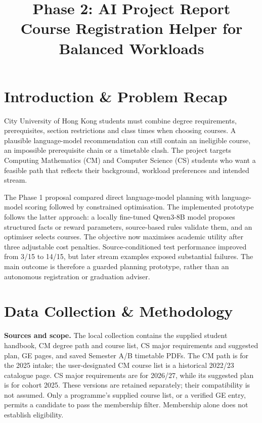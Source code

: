 \documentclass{article}
\title{Phase 2: AI Project Report\\
\large Course Registration Helper for Balanced Workloads}
\author{}
\begin{document}
\maketitle

\section{Introduction \& Problem Recap}
City University of Hong Kong students must combine degree requirements, prerequisites, section restrictions and class times when choosing courses. A plausible language-model recommendation can still contain an ineligible course, an impossible prerequisite chain or a timetable clash. The project targets Computing Mathematics (CM) and Computer Science (CS) students who want a feasible path that reflects their background, workload preferences and intended stream.

The Phase 1 proposal compared direct language-model planning with language-model scoring followed by constrained optimisation. The implemented prototype follows the latter approach: a locally fine-tuned Qwen3-8B model proposes structured facts or reward parameters, source-based rules validate them, and an optimiser selects courses. The objective now maximises academic utility after three adjustable cost penalties. Source-conditioned test performance improved from 3/15 to 14/15, but later stream examples exposed substantial failures. The main outcome is therefore a guarded planning prototype, rather than an autonomous registration or graduation adviser.

\section{Data Collection \& Methodology}
\textbf{Sources and scope.} The local collection contains the supplied student handbook, CM degree path and course list, CS major requirements and suggested plan, GE pages, and saved Semester A/B timetable PDFs\citep{cityu-programmes}. The CM path is for the 2025 intake; the user-designated CM course list is a historical 2022/23 catalogue page. CS major requirements are for 2026/27, while its suggested plan is for cohort 2025. These versions are retained separately; their compatibility is not assumed. Only a programme's supplied course list, or a verified GE entry, permits a candidate to pass the membership filter. Membership alone does not establish eligibility.
\end{document}
